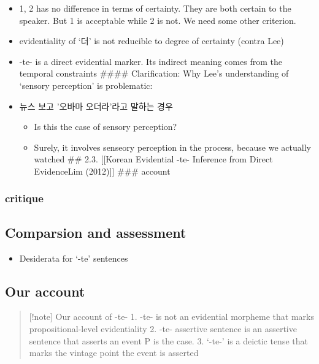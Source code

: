 \begin{itemize}
\item
  1, 2 has no difference in terms of certainty. They are both certain to
  the speaker. But 1 is acceptable while 2 is not. We need some other
  criterion.
\item
  evidentiality of `더' is not reducible to degree of certainty (contra
  Lee)
\item
  -te- is a direct evidential marker. Its indirect meaning comes from
  the temporal constraints \#\#\#\# Clarification: Why Lee's
  understanding of `sensory perception' is problematic:
\item
  뉴스 보고 '오바마 오더라'라고 말하는 경우

  \begin{itemize}
  \tightlist
  \item
    Is this the case of sensory perception?
  \item
    Surely, it involves senseory perception in the process, because we
    actually watched \#\# 2.3. {[}{[}Korean Evidential -te- Inference
    from Direct Evidence\textbar Lim (2012){]}{]} \#\#\# account
  \end{itemize}
\end{itemize}

\hypertarget{critique}{%
\subsubsection{critique}\label{critique}}

\hypertarget{comparsion-and-assessment}{%
\subsection{Comparsion and assessment}\label{comparsion-and-assessment}}

\begin{itemize}
\tightlist
\item
  Desiderata for `-te' sentences
\end{itemize}

\hypertarget{our-account}{%
\subsection{Our account}\label{our-account}}

\begin{quote}
{[}!note{]} Our account of -te- 1. -te- is not an evidential morpheme
that marks propositional-level evidentiality 2. -te- assertive sentence
is an assertive sentence that asserts an event P is the case. 3. `-te-'
is a deictic tense that marks the vintage point the event is asserted
\end{quote}

